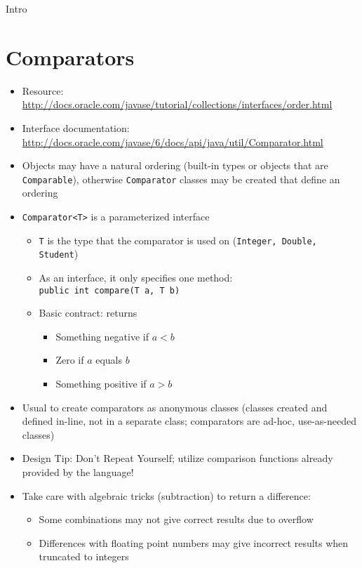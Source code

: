 

Intro

\section{Comparators}

\begin{itemize}
  \item Resource:\\ \url{http://docs.oracle.com/javase/tutorial/collections/interfaces/order.html}
  \item Interface documentation:\\ \url{http://docs.oracle.com/javase/6/docs/api/java/util/Comparator.html}
  \item Objects may have a natural ordering (built-in types or objects that are \texttt{Comparable}),
	otherwise \texttt{Comparator} classes may be created that define an ordering
  \item \texttt{Comparator<T>} is a parameterized interface
	\begin{itemize}
	  \item \texttt{T} is the type that the comparator is used on (\texttt{Integer, Double, Student})
	  \item As an interface, it only specifies one method: \\
		\texttt{public int compare(T a, T b)}
	  \item Basic contract: returns
	    \begin{itemize}
	      \item Something negative if $a < b$
	      \item Zero if $a$ equals $b$
	      \item Something positive if $a > b$
	    \end{itemize}
	\end{itemize}
  \item Usual to create comparators as anonymous classes (classes created and defined in-line,
		not in a separate class; comparators are ad-hoc, use-as-needed classes)
  \item Design Tip: Don't Repeat Yourself; utilize comparison functions already provided by the language!
  \item Take care with algebraic tricks (subtraction) to return a difference:
  \begin{itemize}
    \item Some combinations may not give correct results due to overflow
    \item Differences with floating point numbers may give incorrect results when truncated to integers
  \end{itemize}
\end{itemize}

